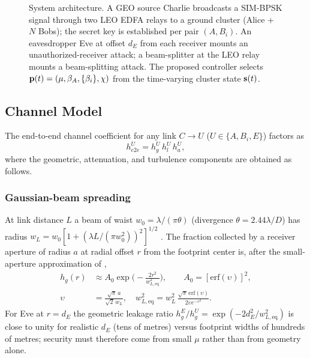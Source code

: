 \begin{figure}[!htbp]
\centering
\resizebox{0.92\textwidth}{!}{}
\caption{System architecture. A GEO source Charlie broadcasts a SIM-BPSK signal through two LEO EDFA relays to a ground cluster (Alice + $N$ Bobs); the secret key is established per pair $(A,B_i)$. An eavesdropper Eve at offset $d_E$ from each receiver mounts an unauthorized-receiver attack; a beam-splitter at the LEO relay mounts a beam-splitting attack. The proposed controller selects $\mathbf{p}(t) = (\mu, \beta_A, \{\beta_i\}, \chi)$ from the time-varying cluster state $\mathbf{s}(t)$.}
\label{fig:arch}
\end{figure}

\subsection{Channel Model}\label{sec:system:channel}

The end-to-end channel coefficient for any link $C\to U$ ($U\in\{A,B_i,E\}$) factors as
\begin{equation}
  h_{e2e}^U = h_g^U\, h_l^U\, h_a^U,
\end{equation}
where the geometric, attenuation, and turbulence components are obtained as follows.

\subsubsection{Gaussian-beam spreading}
At link distance $L$ a beam of waist $w_0 = \lambda/(\pi\theta)$ (divergence $\theta = 2.44\lambda/D$) has radius $w_L = w_0 [1+(\lambda L/(\pi w_0^2))^2]^{1/2}$ \cite{andrews2005laser}. The fraction collected by a receiver aperture of radius $a$ at radial offset $r$ from the footprint center is, after the small-aperture approximation of \cite{farid2007outage},
\begin{align}
  h_g(r) &\approx A_0 \exp\!\Big(-\frac{2r^2}{w_{L,\mathrm{eq}}^2}\Big),\qquad A_0 = [\mathrm{erf}(\upsilon)]^2, \label{eq:hg}\\
  \upsilon &= \frac{\sqrt\pi\,a}{\sqrt2\,w_L},\quad
  w_{L,\mathrm{eq}}^2 = w_L^2\,\frac{\sqrt\pi\,\mathrm{erf}(\upsilon)}{2\upsilon e^{-\upsilon^2}}.\label{eq:weq}
\end{align}
For Eve at $r = d_E$ the geometric leakage ratio $h_g^E/h_g^U = \exp(-2 d_E^2/w_{L,\mathrm{eq}}^2)$ is close to unity for realistic $d_E$ (tens of metres) versus footprint widths of hundreds of metres; security must therefore come from small $\mu$ rather than from geometry alone.


